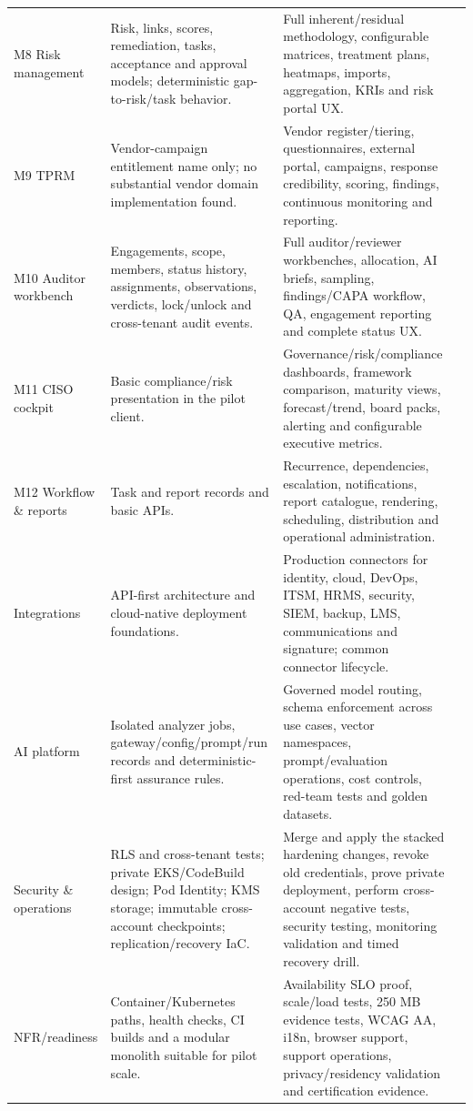 \documentclass[11pt,a4paper]{article}
\begin{document}
\begin{longtable}{@{}>{\raggedright\arraybackslash}p{} >{\raggedright\arraybackslash}p{} >{\raggedright\arraybackslash}p{} >{\raggedleft\arraybackslash}p{}@{}}
M8 Risk management & Risk, links, scores, remediation, tasks, acceptance and approval models; deterministic gap-to-risk/task behavior. & Full inherent/residual methodology, configurable matrices, treatment plans, heatmaps, imports, aggregation, KRIs and risk portal UX. & 35 \\
M9 TPRM & Vendor-campaign entitlement name only; no substantial vendor domain implementation found. & Vendor register/tiering, questionnaires, external portal, campaigns, response credibility, scoring, findings, continuous monitoring and reporting. & 5 \\
M10 Auditor workbench & Engagements, scope, members, status history, assignments, observations, verdicts, lock/unlock and cross-tenant audit events. & Full auditor/reviewer workbenches, allocation, AI briefs, sampling, findings/CAPA workflow, QA, engagement reporting and complete status UX. & 45 \\
M11 CISO cockpit & Basic compliance/risk presentation in the pilot client. & Governance/risk/compliance dashboards, framework comparison, maturity views, forecast/trend, board packs, alerting and configurable executive metrics. & 20 \\
M12 Workflow \& reports & Task and report records and basic APIs. & Recurrence, dependencies, escalation, notifications, report catalogue, rendering, scheduling, distribution and operational administration. & 20 \\
Integrations & API-first architecture and cloud-native deployment foundations. & Production connectors for identity, cloud, DevOps, ITSM, HRMS, security, SIEM, backup, LMS, communications and signature; common connector lifecycle. & 10 \\
AI platform & Isolated analyzer jobs, gateway/config/prompt/run records and deterministic-first assurance rules. & Governed model routing, schema enforcement across use cases, vector namespaces, prompt/evaluation operations, cost controls, red-team tests and golden datasets. & 20 \\
Security \& operations & RLS and cross-tenant tests; private EKS/CodeBuild design; Pod Identity; KMS storage; immutable cross-account checkpoints; replication/recovery IaC. & Merge and apply the stacked hardening changes, revoke old credentials, prove private deployment, perform cross-account negative tests, security testing, monitoring validation and timed recovery drill. & 65 \\
NFR/readiness & Container/Kubernetes paths, health checks, CI builds and a modular monolith suitable for pilot scale. & Availability SLO proof, scale/load tests, 250 MB evidence tests, WCAG AA, i18n, browser support, support operations, privacy/residency validation and certification evidence. & 35 \\
\bottomrule
\end{longtable}
\normalsize
\end{document}
